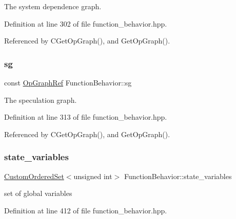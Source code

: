 The system dependence graph. 



Definition at line 302 of file function\+\_\+behavior.\+hpp.



Referenced by C\+Get\+Op\+Graph(), and Get\+Op\+Graph().

\mbox{\label{classFunctionBehavior_ada707e113446bf70398f1b3612a012f9}} 
\subsubsection{\texorpdfstring{sg}{sg}}
{\footnotesize\ttfamily const \hyperlink{op__graph_8hpp_aee97c95c40f791b60c451d9e29c72d39}{Op\+Graph\+Ref} Function\+Behavior\+::sg\hspace{0.3cm}{\ttfamily [private]}}



The speculation graph. 



Definition at line 313 of file function\+\_\+behavior.\+hpp.



Referenced by C\+Get\+Op\+Graph(), and Get\+Op\+Graph().

\mbox{\label{classFunctionBehavior_a3c944212c997d99ad71abc0afc7a72ee}} 
\subsubsection{\texorpdfstring{state\+\_\+variables}{state\_variables}}
{\footnotesize\ttfamily \hyperlink{classCustomOrderedSet}{Custom\+Ordered\+Set}$<$unsigned int$>$ Function\+Behavior\+::state\+\_\+variables\hspace{0.3cm}{\ttfamily [private]}}



set of global variables 



Definition at line 412 of file function\+\_\+behavior.\+hpp.

\mbox{\label{classFunctionBehavior_a062d9b8d97d2d023acf71bbe6e7f080b}} 
